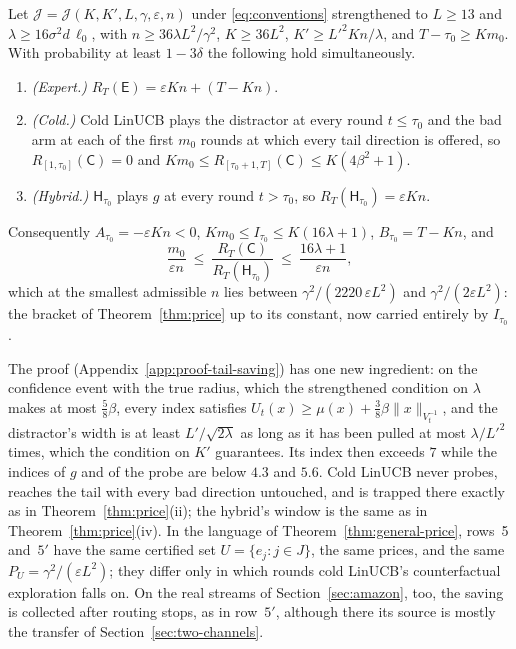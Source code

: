 \documentclass[anon]{alt2027} %
\newcommand{\eps}{\varepsilon}
\newcommand{\Cold}{\mathsf{C}}
\newcommand{\Exp}{\mathsf{E}}
\newcommand{\Hyb}{\mathsf{H}}
\begin{document}
\begin{proposition}
\label{prop:cat-tail-saving}
Let $\mathcal J=\mathcal J(K,K',L,\gamma,\eps,n)$ under \eqref{eq:conventions}
strengthened to $L\ge13$ and $\lambda\ge16\sigma^2d\,\ell_0$, with
$n\ge36\lambda L^2/\gamma^2$, $K\ge36L^2$, $K'\ge L'^2Kn/\lambda$, and
$T-\tau_0\ge Km_0$. With probability at least $1-3\delta$ the following hold
simultaneously.
\begin{enumerate}[itemsep=1pt,topsep=1pt,leftmargin=*]
\item[(i)] \emph{(Expert.)} $R_T(\Exp)=\eps Kn+(T-Kn)$.
\item[(ii)] \emph{(Cold.)} Cold LinUCB plays the distractor at every round
$t\le\tau_0$ and the bad arm at each of the first $m_0$ rounds at which every
tail direction is offered, so $R_{[1,\tau_0]}(\Cold)=0$ and
$Km_0\le R_{[\tau_0+1,T]}(\Cold)\le K(4\beta^2+1)$.
\item[(iii)] \emph{(Hybrid.)} $\Hyb_{\tau_0}$ plays $g$ at every round
$t>\tau_0$, so $R_T(\Hyb_{\tau_0})=\eps Kn$.
\end{enumerate}
Consequently $A_{\tau_0}=-\eps Kn<0$, $Km_0\le I_{\tau_0}\le K(16\lambda+1)$,
$B_{\tau_0}=T-Kn$, and
\[
\frac{m_0}{\eps n}\ \le\ \frac{R_T(\Cold)}{R_T(\Hyb_{\tau_0})}\ \le\ \frac{16\lambda+1}{\eps n},
\]
which at the smallest admissible $n$ lies between $\gamma^2/(2220\,\eps L^2)$ and
$\gamma^2/(2\eps L^2)$: the bracket of Theorem~\ref{thm:price} up to its constant,
now carried entirely by $I_{\tau_0}$.
\end{proposition}

The proof (Appendix~\ref{app:proof-tail-saving}) has one new ingredient: on
the confidence event with the true radius, which the strengthened condition
on $\lambda$ makes at most $\tfrac58\beta$, every index satisfies
$U_t(x)\ge\mu(x)+\tfrac38\beta\|x\|_{V_t^{-1}}$, and the distractor's width is
at least $L'/\sqrt{2\lambda}$ as long as it has been pulled at most
$\lambda/L'^2$ times, which the condition on $K'$ guarantees. Its index then
exceeds $7$ while the indices of $g$ and of the probe are below $4.3$ and
$5.6$. Cold LinUCB never probes, reaches the tail with every bad direction
untouched, and is trapped there exactly as in Theorem~\ref{thm:price}(ii);
the hybrid's window is the same as in Theorem~\ref{thm:price}(iv). In the
language of Theorem~\ref{thm:general-price}, rows~5 and~$5'$ have the same
certified set $U=\{e_j:j\in J\}$, the same prices, and the same $P_U=\gamma^2/(\eps L^2)$;
they differ only in which rounds cold LinUCB's counterfactual exploration
falls on. On the real streams of Section~\ref{sec:amazon}, too, the saving
is collected after routing stops, as in row~$5'$, although there its source
is mostly the transfer of Section~\ref{sec:two-channels}.
\end{document}
